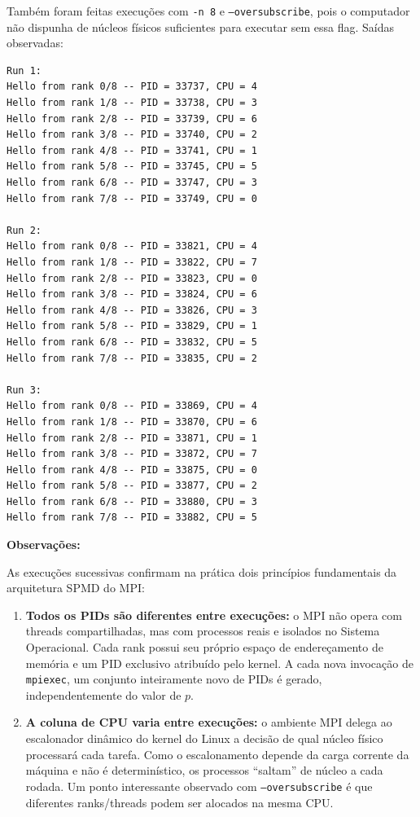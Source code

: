 \documentclass[12pt,a4paper]{article}
\begin{document}
Também foram feitas execuções com \texttt{-n 8} e \texttt{--oversubscribe}, pois o computador não dispunha de núcleos físicos suficientes para executar sem essa flag. Saídas observadas:

\begin{lstlisting}[style=shell]
Run 1:
Hello from rank 0/8 -- PID = 33737, CPU = 4
Hello from rank 1/8 -- PID = 33738, CPU = 3
Hello from rank 2/8 -- PID = 33739, CPU = 6
Hello from rank 3/8 -- PID = 33740, CPU = 2
Hello from rank 4/8 -- PID = 33741, CPU = 1
Hello from rank 5/8 -- PID = 33745, CPU = 5
Hello from rank 6/8 -- PID = 33747, CPU = 3
Hello from rank 7/8 -- PID = 33749, CPU = 0

Run 2:
Hello from rank 0/8 -- PID = 33821, CPU = 4
Hello from rank 1/8 -- PID = 33822, CPU = 7
Hello from rank 2/8 -- PID = 33823, CPU = 0
Hello from rank 3/8 -- PID = 33824, CPU = 6
Hello from rank 4/8 -- PID = 33826, CPU = 3
Hello from rank 5/8 -- PID = 33829, CPU = 1
Hello from rank 6/8 -- PID = 33832, CPU = 5
Hello from rank 7/8 -- PID = 33835, CPU = 2

Run 3:
Hello from rank 0/8 -- PID = 33869, CPU = 4
Hello from rank 1/8 -- PID = 33870, CPU = 6
Hello from rank 2/8 -- PID = 33871, CPU = 1
Hello from rank 3/8 -- PID = 33872, CPU = 7
Hello from rank 4/8 -- PID = 33875, CPU = 0
Hello from rank 5/8 -- PID = 33877, CPU = 2
Hello from rank 6/8 -- PID = 33880, CPU = 3
Hello from rank 7/8 -- PID = 33882, CPU = 5
\end{lstlisting}

\textbf{Observações:}

As execuções sucessivas confirmam na prática dois princípios fundamentais da arquitetura SPMD do MPI:

\begin{enumerate}
  \item \textbf{Todos os PIDs são diferentes entre execuções:} o MPI não opera com threads compartilhadas, mas com processos reais e isolados no Sistema Operacional. Cada rank possui seu próprio espaço de endereçamento de memória e um PID exclusivo atribuído pelo kernel. A cada nova invocação de \texttt{mpiexec}, um conjunto inteiramente novo de PIDs é gerado, independentemente do valor de $p$.

  \item \textbf{A coluna de CPU varia entre execuções:} o ambiente MPI delega ao escalonador dinâmico do kernel do Linux a decisão de qual núcleo físico processará cada tarefa. Como o escalonamento depende da carga corrente da máquina e não é determinístico, os processos ``saltam'' de núcleo a cada rodada. Um ponto interessante observado com \texttt{--oversubscribe} é que diferentes ranks/threads podem ser alocados na mesma CPU.
\end{enumerate}
\end{document}
